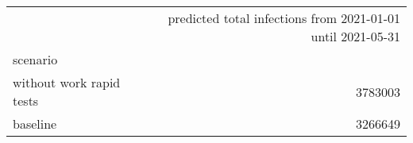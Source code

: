 \begin{tabular}{lr}
\toprule
{} &  predicted total infections from 2021-01-01 until 2021-05-31 \\
scenario                  &                                                              \\
\midrule
 without work rapid tests &                                            3783003 \\
 baseline                 &                                            3266649 \\
\bottomrule
\end{tabular}

